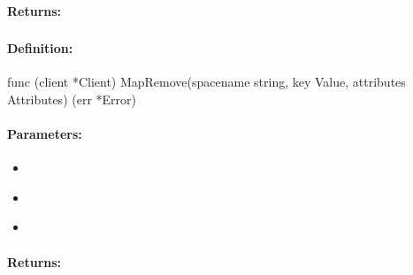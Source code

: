 \paragraph{Returns:}


\pagebreak
\subsubsection{}
\label{api:Go:MapRemove}


\paragraph{Definition:}
\begin{gocode}
func (client *Client) MapRemove(spacename string, key Value, attributes Attributes) (err *Error)
\end{gocode}

\paragraph{Parameters:}
\begin{itemize}[noitemsep]
\item {}\\

\item {}\\

\item {}\\

\end{itemize}

\paragraph{Returns:}


\pagebreak
\subsubsection{}
\label{api:Go:CondMapRemove}


